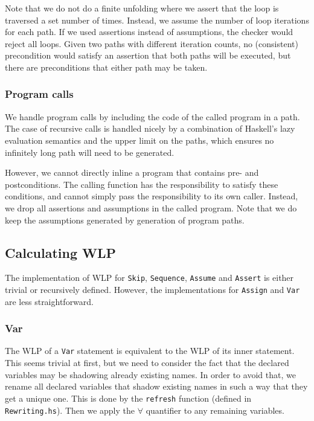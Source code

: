 \documentclass[a4paper]{article}
\begin{document}
Note that we do not do a finite unfolding where we assert that the loop is
traversed a set number of times. Instead, we assume the number of loop
iterations for each path. If we used assertions instead of assumptions, the
checker would reject all loops. Given two paths with different iteration counts,
no (consistent) precondition would satisfy an assertion that both paths will
be executed, but there are preconditions that either path may be taken.

\subsubsection*{Program calls}

We handle program calls by including the code of the called program in a path.
The case of recursive calls is handled nicely by a combination of Haskell's
lazy evaluation semantics and the upper limit on the paths, which ensures no
infinitely long path will need to be generated.

However, we cannot directly inline a program that contains pre- and
postconditions. The calling function has the responsibility to satisfy these
conditions, and cannot simply pass the responsibility to its own caller.
Instead, we drop all assertions and assumptions in the called program. Note
that we do keep the assumptions generated by generation of program paths.

\subsection{Calculating WLP}

The implementation of WLP for \texttt{Skip}, \texttt{Sequence}, \texttt{Assume}
and \texttt{Assert} is either trivial or recursively defined. However, the
implementations for \texttt{Assign} and \texttt{Var} are less straightforward.

\subsubsection*{Var}

The WLP of a \texttt{Var} statement is equivalent to the WLP of its inner
statement. This seems trivial at first, but we need to consider the fact that
the declared variables may be shadowing already existing names. In order to
avoid that, we rename all declared variables that shadow existing names in
such a way that they get a unique one. This is done by the \texttt{refresh}
function (defined in \texttt{Rewriting.hs}). Then we apply the $\forall$
quantifier to any remaining variables.
\end{document}
